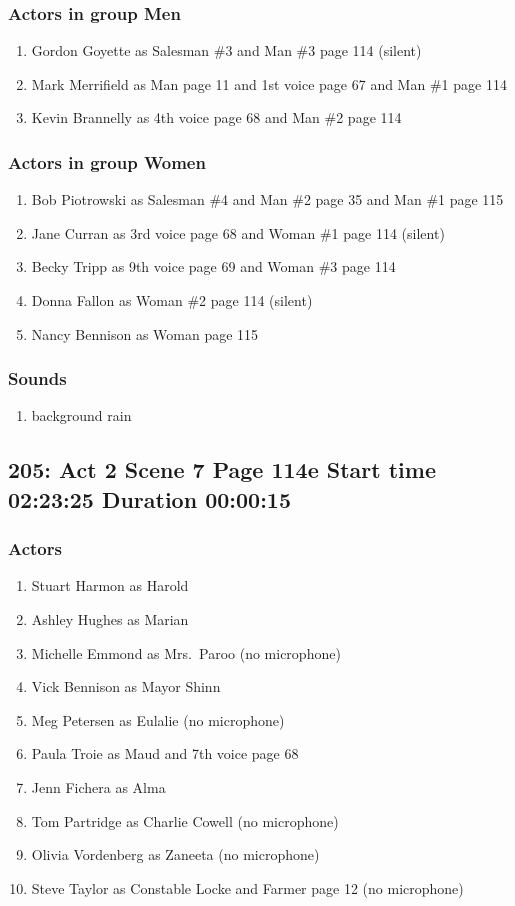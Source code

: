 \subsubsection{Actors in group Men}
\begin{enumerate}
\item Gordon Goyette as Salesman \#3 and Man \#3 page 114 (silent)
\item Mark Merrifield as Man page 11 and 1st voice page 67 and Man \#1 page 114
\item Kevin Brannelly as 4th voice page 68 and Man \#2 page 114
\end{enumerate}
\subsubsection{Actors in group Women}
\begin{enumerate}
\item Bob Piotrowski as Salesman \#4 and Man \#2 page 35 and Man \#1 page 115
\item Jane Curran as 3rd voice page 68 and Woman \#1 page 114 (silent)
\item Becky Tripp as 9th voice page 69 and Woman \#3 page 114
\item Donna Fallon as Woman \#2 page 114 (silent)
\item Nancy Bennison as Woman page 115
\end{enumerate}

\subsubsection{Sounds}
\begin{enumerate}
\item background rain
\end{enumerate}
\subsection{205: Act 2 Scene 7 Page 114e Start time 02:23:25 Duration 00:00:15}

\subsubsection{Actors}
\begin{enumerate}
\item Stuart Harmon as Harold
\item Ashley Hughes as Marian
\item Michelle Emmond as Mrs.~Paroo (no microphone)
\item Vick Bennison as Mayor Shinn
\item Meg Petersen as Eulalie (no microphone)
\item Paula Troie as Maud and 7th voice page 68
\item Jenn Fichera as Alma
\item Tom Partridge as Charlie Cowell (no microphone)
\item Olivia Vordenberg as Zaneeta (no microphone)
\item Steve Taylor as Constable Locke and Farmer page 12 (no microphone)
\end{enumerate}
